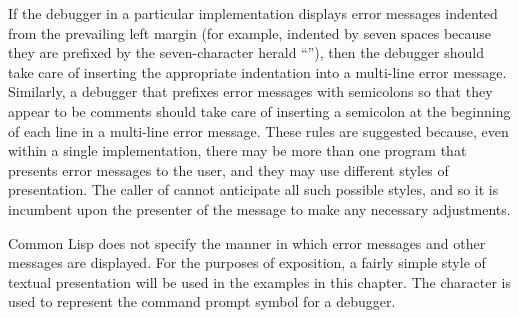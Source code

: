 \beforenoterule
\begin{implementation}
If the debugger in a particular implementation
displays error messages indented from the prevailing left margin
(for example, indented by seven spaces because
they are prefixed by the seven-character herald ``''),
then the debugger should take care of inserting
the appropriate indentation into a multi-line error message.
Similarly, a debugger that prefixes error messages with semicolons
so that they appear to be comments
should take care of inserting a semicolon at the beginning of each
line in a multi-line error message.  These rules are suggested
because, even within a single
implementation, there may be more than one program that presents error
messages to the user, and they may use different styles of
presentation.  The caller
of  cannot anticipate all such possible styles,
and so it is incumbent upon the presenter of the message
to make any necessary adjustments.
\end{implementation}
\afternoterule

Common Lisp does not specify the manner in which error messages and
other messages are displayed.  For the purposes of exposition,
a fairly simple style of textual presentation will be used in the
examples in this chapter.  The character \cd{>} is used
to represent the command prompt symbol for a debugger.

